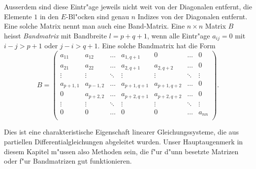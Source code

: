 Ausserdem sind diese Eintr"age jeweils nicht weit von der Diagonalen
entfernt, die Elemente $1$ in den $E$-Bl"ocken sind genau $n$ Indizes
von der Diagonalen entfernt. Eine solche Matrix nennt man auch eine
Band-Matrix.
Eine $n\times n$ Matrix $B$ heisst \textsl{Bandmatrix} mit Bandbreite $l=p+q+1$,
wenn alle Eintr"age $a_{ij} = 0$ mit $i -j > p+1$ oder $j-i > q+1$. Eine solche
Bandmatrix hat die Form 
\[
B=\begin{pmatrix}
   a_{11}&   a_{12}&\dots &a_{1,q+1}  & 0         &\dots &     0\\
   a_{21}&   a_{22}&\dots &a_{2,q+1}  &a_{2,q+2}  &\dots &     0\\
   \vdots& \vdots  &\ddots&\vdots     &\vdots     &\ddots&\vdots\\
a_{p+1,1}&a_{p-1,2}&\dots &a_{p+1,q+1}&a_{p+1,q+2}&\dots &     0\\
        0&a_{p+2,2}&\dots &a_{p+2,q+1}&a_{p+2,q+2}&\dots &     0\\
   \vdots&\vdots   &\ddots&\vdots     &\vdots     &\ddots&\vdots\\
        0&        0&\dots &     0     &     0     &\dots &a_{nn}\\
\end{pmatrix}.
\]

Dies ist eine charakteristische Eigenschaft linearer Gleichungssysteme,
die aus partiellen Differentialgleichungen abgeleitet wurden.
Unser Hauptaugenmerk in diesem Kapitel m"ussen also Methoden sein,
die f"ur d"unn besetzte Matrizen oder f"ur Bandmatrizen gut funktionieren.

